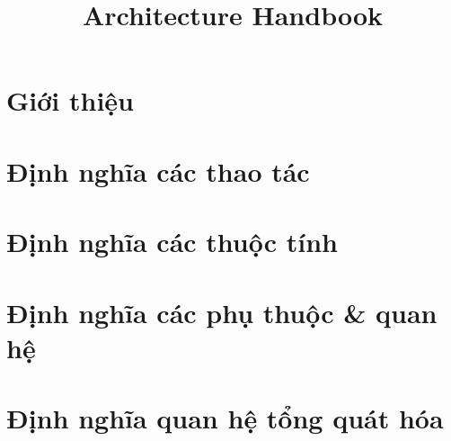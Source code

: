 \documentclass[12pt, a4paper]{article}
\title{Architecture Handbook}
\begin{document}

\clearpage


\clearpage

\tableofcontents
\clearpage

%	




% 
\section{Giới thiệu}


\section{Định nghĩa các thao tác}

\section{Định nghĩa các thuộc tính}

\section{Định nghĩa các phụ thuộc \& quan hệ}

\section{Định nghĩa quan hệ tổng quát hóa}


\end{document}

